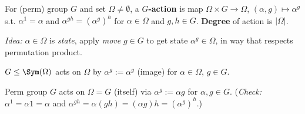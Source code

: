 \begin{slide}
    \begin{definition}
        \vspace{0pt}
        For (perm) group $G$ and set $\Omega \neq \emptyset$, a \textbf{$G$-action} is map $\Omega \times G \to \Omega$, $(\alpha,g) \mapsto \alpha^g$ s.t. $\alpha^1 = \alpha$ and $\alpha^{gh} = (\alpha^g)^h$ for $\alpha \in \Omega$ and $g,h \in G$. \textbf{Degree} of action is $|\Omega|$.
    \end{definition}

    \textit{Idea:} $\alpha \in \Omega$ is \textit{state}, apply \textit{move} $g \in G$ to get state $\alpha^g \in \Omega$, in way that respects permutation product. \pause

    \begin{example}
        \vspace{0pt}
        $G \leq \Sym(\Omega)$ acts on $\Omega$ by $\alpha^g := \alpha^g$ (image) for $\alpha \in \Omega$, $g \in G$.
    \end{example} \pause

    \begin{example}
        \vspace{0pt}
        Perm group $G$ acts on $\Omega = G$ (itself) via $\alpha^g := \alpha g$ for $\alpha,g \in G$. (\textit{Check:} $\alpha^1 = \alpha 1 = \alpha$ and $\alpha^{gh} = \alpha(gh) = (\alpha g)h = (\alpha^g)^h$.)
    \end{example}

\end{slide}

